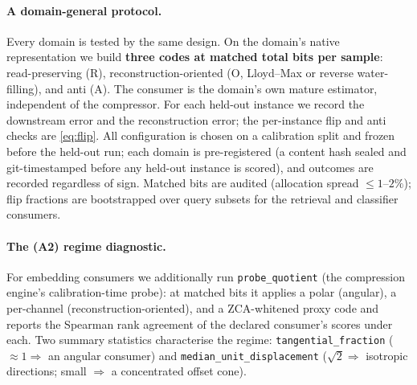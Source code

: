 \documentclass[11pt]{article}
\theoremstyle{remark}
\begin{document}
\paragraph{A domain-general protocol.} Every domain is tested by the same design. On the
domain's native representation we build \textbf{three codes at matched total bits per
sample}: read-preserving (R), reconstruction-oriented (O, Lloyd--Max or reverse
water-filling), and anti (A). The consumer is the domain's own mature estimator,
independent of the compressor. For each held-out instance we record the downstream error
and the reconstruction error; the per-instance flip and anti checks are \eqref{eq:flip}.
All configuration is chosen on a calibration split and frozen before the held-out run;
each domain is pre-registered (a content hash sealed and git-timestamped before any
held-out instance is scored), and outcomes are recorded regardless of sign. Matched bits
are audited (allocation spread $\le1$--$2\%$); flip fractions are bootstrapped over
query subsets for the retrieval and classifier consumers.

\paragraph{The (A2) regime diagnostic.} For embedding consumers we additionally run
\texttt{probe\_quotient} (the compression engine's calibration-time probe): at matched
bits it applies a polar (angular), a per-channel (reconstruction-oriented), and a
ZCA-whitened proxy code and reports the Spearman rank agreement of the declared
consumer's scores under each. Two summary statistics characterise the regime:
\texttt{tangential\_fraction} ($\approx1\Rightarrow$ an angular consumer) and
\texttt{median\_unit\_displacement} ($\sqrt2\Rightarrow$ isotropic directions; small
$\Rightarrow$ a concentrated offset cone).
\end{document}
